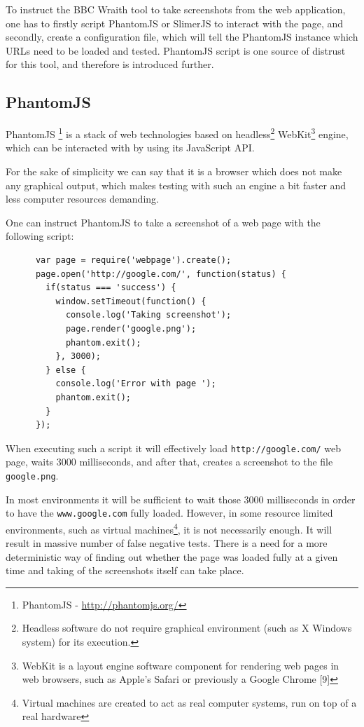 \documentclass[11pt,oneside,final]{fithesis2}
\begin{document}
  To instruct the BBC Wraith tool to take screenshots from the web application, one has to firstly script PhantomJS or SlimerJS to interact with the page, and secondly, create a 
  configuration file, which will tell the PhantomJS instance which URLs need to be loaded and tested. PhantomJS script is one source of distrust for this tool, and therefore is
  introduced further.
  
    \subsection{PhantomJS}
    \label{subsec:phantomJS}
    PhantomJS \footnote{PhantomJS - \url{http://phantomjs.org/}} is a stack of web technologies based on headless\footnote{Headless software do not require graphical environment (such as X Windows system) for its execution.} 
    WebKit\footnote{WebKit is a layout engine software component for rendering web pages in web browsers, such as Apple's Safari or previously a Google Chrome [9]} engine, which can be 
    interacted with by using its JavaScript API.
    
    For the sake of simplicity we can say that it is a browser which does not make any graphical output, which makes testing with such an engine a bit faster and less computer resources 
    demanding.
    
    One can instruct PhantomJS to take a screenshot of a web page with the following script:
  
    \begin{verbatim}
      var page = require('webpage').create();
      page.open('http://google.com/', function(status) {
        if(status === 'success') {
          window.setTimeout(function() {
            console.log('Taking screenshot');
            page.render('google.png');
            phantom.exit();
          }, 3000);
        } else {
          console.log('Error with page ');
          phantom.exit();
        }
      });
    \end{verbatim}
    
    When executing such a script it will effectively load \texttt{http://google.com/} web page, waits 3000 milliseconds, and after that, creates a screenshot to the file \texttt{google.png}.
    
    In most environments it will be sufficient to wait those 3000 milliseconds in order to have the \texttt{www.google.com} fully loaded. However, in some resource limited environments, 
    such as virtual machines\footnote{Virtual machines are created to act as real computer systems, run on top of a real hardware}, it is not necessarily enough. 
    It will result in massive number of false negative tests. There is a need for a more deterministic way of finding out whether the page was loaded fully at a given time and 
    taking of the screenshots itself can take place.
    
\end{document}
